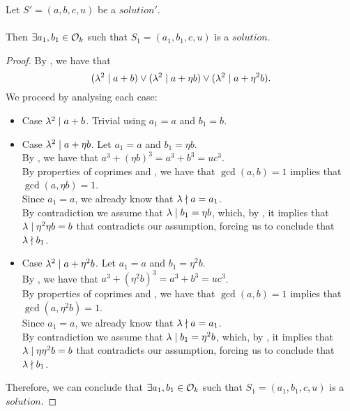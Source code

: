 \begin{lemma}
    \label{lmm:ex_dvd_a_add_b}
    \leanok
    Let $S'=(a, b, c, u)$ be a $solution'$.\\\\
    Then $\exists a_1,b_1 \in \mathcal{O}_k$ such that $S_1=(a_1,b_1,c,u)$ is a $solution$.
\end{lemma}
\begin{proof}
    \leanok
    By , we have that
    $$(\lambda^2 \mid a + b) \lor (\lambda^2 \mid a +
    \eta b) \lor (\lambda^2 \mid a + \eta^2 b).$$
    We proceed by analysing each case:
    \begin{itemize}
        \item Case $\lambda^2 \mid a + b$. Trivial using $a_1=a$ and $b_1=b$.
        \item Case $\lambda^2 \mid a + \eta b$. Let $a_1=a$ and $b_1=\eta b$. \\
        By , we have that $a^3 + (\eta b)^3 = a^3 + b^3 = u c^3$.\\
        By properties of coprimes and , we have that
        $\gcd(a,b)=1$ implies that $\gcd(a,\eta b)=1$.\\
        Since $a_1=a$, we already know that $\lambda \nmid a = a_1$.\\
        By contradiction we assume that $\lambda \mid b_1 = \eta b$, which,
        by , it implies that $\lambda \mid \eta^2 \eta b = b$
        that contradicts our assumption, forcing us to conclude that $\lambda \nmid b_1$.
        \item Case $\lambda^2 \mid a + \eta^2 b$. Let $a_1=a$ and $b_1=\eta^2 b$. \\
        By , we have that $a^3 + (\eta^2 b)^3 = a^3 + b^3 = u c^3$.\\
        By properties of coprimes and , we have that
        $\gcd(a,b)=1$ implies that $\gcd(a,\eta^2 b)=1$.\\
        Since $a_1=a$, we already know that $\lambda \nmid a = a_1$.\\
        By contradiction we assume that $\lambda \mid b_1 = \eta^2 b$, which,
        by , it implies that $\lambda \mid \eta \eta^2 b = b$
        that contradicts our assumption, forcing us to conclude that $\lambda \nmid b_1$.
    \end{itemize}
    Therefore, we can conclude that
    $\exists a_1,b_1 \in \mathcal{O}_k$ such that $S_1=(a_1,b_1,c,u)$ is a $solution$.
\end{proof}


